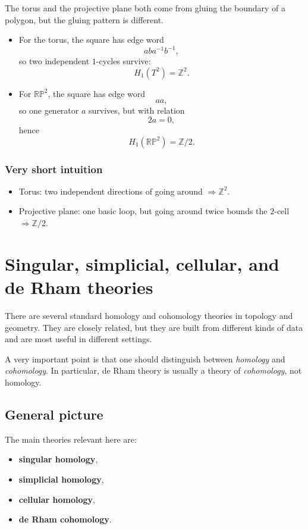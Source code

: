 \documentclass[12pt,a4paper]{article}
\theoremstyle{notespace}
\begin{document}
The torus and the projective plane both come from gluing the boundary of a polygon, but the gluing pattern is different.

\begin{itemize}
	\item For the torus, the square has edge word
	\[
	aba^{-1}b^{-1},
	\]
	so two independent \(1\)-cycles survive:
	\[
	H_1(T^2)=\mathbb Z^2.
	\]
	
	\item For \(\mathbb{RP}^2\), the square has edge word
	\[
	aa,
	\]
	so one generator \(a\) survives, but with relation
	\[
	2a=0,
	\]
	hence
	\[
	H_1(\mathbb{RP}^2)=\mathbb Z/2.
	\]
\end{itemize}

\subsubsection{Very short intuition}

\begin{itemize}
	\item Torus: two independent directions of going around \(\Rightarrow \mathbb Z^2\).
	\item Projective plane: one basic loop, but going around twice bounds the \(2\)-cell \(\Rightarrow \mathbb Z/2\).
\end{itemize}

\section{Singular, simplicial, cellular, and de Rham theories}

There are several standard homology and cohomology theories in topology and geometry. They are closely related, but they are built from different kinds of data and are most useful in different settings.

A very important point is that one should distinguish between \emph{homology} and \emph{cohomology}. In particular, de Rham theory is usually a theory of \emph{cohomology}, not homology.

\subsection{ General picture}

The main theories relevant here are:

\begin{itemize}
	\item \textbf{singular homology},
	\item \textbf{simplicial homology},
	\item \textbf{cellular homology},
	\item \textbf{de Rham cohomology}.
\end{itemize}
\end{document}
